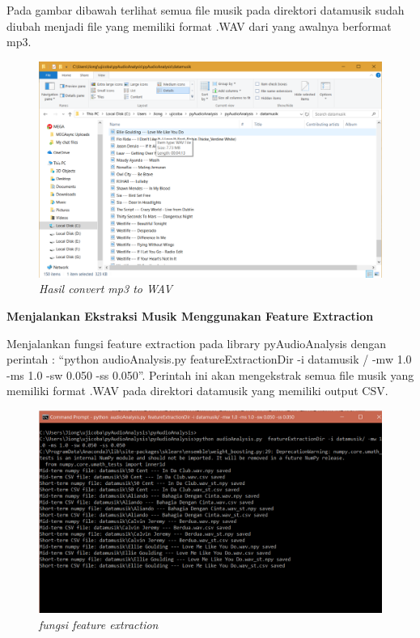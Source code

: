     \par\hspace{1cm}Pada gambar dibawah terlihat semua file musik pada direktori datamusik sudah diubah menjadi file yang memiliki format .WAV  dari yang awalnya berformat mp3. 
    \begin{figure} [htbp]
    \centering
    \includegraphics[scale=0.4] {figures/realimage029.PNG}
    \caption{\textit{ Hasil convert mp3 to WAV }}
    \end{figure}

\par\textbf{Menjalankan Ekstraksi Musik Menggunakan Feature Extraction}
    \par\hspace{1cm}Menjalankan fungsi feature extraction pada library  pyAudioAnalysis dengan  perintah : “python audioAnalysis.py  featureExtractionDir -i datamusik / -mw 1.0 -ms 1.0 -sw 0.050 -ss 0.050”.  Perintah ini akan mengekstrak semua file musik yang memiliki format .WAV pada direktori datamusik yang memiliki output CSV.  \begin{figure} [htbp]
    \centering
    \includegraphics[scale=0.4] {figures/image031.png}
    \caption{\textit{fungsi feature extraction }}
    \end{figure}
    
